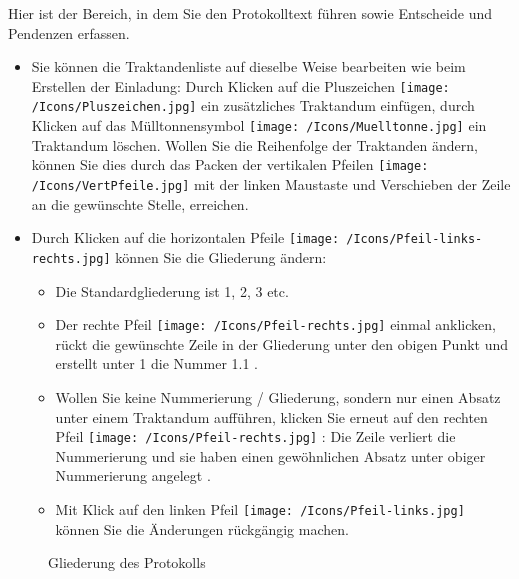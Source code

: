 Hier ist der Bereich, in dem Sie den Protokolltext führen sowie Entscheide und Pendenzen erfassen.

\begin{itemize}
\item
Sie können die Traktandenliste auf dieselbe Weise bearbeiten wie beim Erstellen der Einladung: Durch Klicken auf die Pluszeichen \texttt{[image: /Icons/Pluszeichen.jpg]}  ein zusätzliches Traktandum einfügen, durch Klicken auf das Mülltonnensymbol \texttt{[image: /Icons/Muelltonne.jpg]}  ein Traktandum löschen. Wollen Sie die Reihenfolge der Traktanden ändern, können Sie dies durch das Packen der vertikalen Pfeilen \texttt{[image: /Icons/VertPfeile.jpg]}  mit der linken Maustaste und Verschieben der Zeile an die gewünschte Stelle, erreichen.
\item
Durch Klicken auf die horizontalen Pfeile \texttt{[image: /Icons/Pfeil-links-rechts.jpg]}  können Sie die Gliederung ändern:

	\begin{itemize}
		\item
		Die Standardgliederung ist 1, 2, 3 etc. 
		\item
		Der rechte Pfeil \texttt{[image: /Icons/Pfeil-rechts.jpg]}  einmal anklicken, rückt die gewünschte Zeile in der Gliederung unter den obigen Punkt und erstellt unter 1 die Nummer 1.1 .
		\item
		Wollen Sie keine Nummerierung / Gliederung, sondern nur einen Absatz unter einem Traktandum aufführen, klicken Sie erneut auf den rechten Pfeil \texttt{[image: /Icons/Pfeil-rechts.jpg]} : Die Zeile verliert die Nummerierung und sie haben einen gewöhnlichen Absatz unter obiger Nummerierung angelegt .
		\item
		Mit Klick auf den linken Pfeil \texttt{[image: /Icons/Pfeil-links.jpg]}  können Sie die Änderungen rückgängig machen.
	\end{itemize}
\end{itemize}

\begin{figure}[H]
\caption{Gliederung des Protokolls}
\end{figure}

